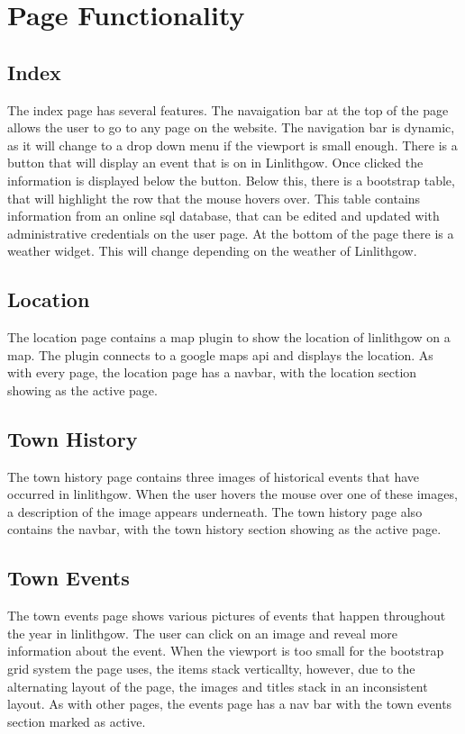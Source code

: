 \documentclass[12pt,a4paper]{article}
\begin{document}
	\clearpage

	\section{Page Functionality}
		\subsection{Index}
		The index page has several features. The navaigation bar at the top of the page allows the user to go to any page on the website. The navigation bar is dynamic, as it will change to a drop down menu if the viewport is small enough. There is a button that will display an event that is on in Linlithgow. Once clicked the information is displayed below the button. Below this, there is a bootstrap table, that will highlight the row that the mouse hovers over. This table contains information from an online sql database, that can be edited and updated with administrative credentials on the user page. At the bottom of the page there is a weather widget. This will change depending on the weather of Linlithgow.

		\subsection{Location}
		The location page contains a map plugin to show the location of linlithgow on a map. The plugin connects to a google maps api and displays the location. As with every page, the location page has a navbar, with the location section showing as the active page.

		\subsection{Town History}
		The town history page contains three images of historical events that have occurred in linlithgow. When the user hovers the mouse over one of these images, a description of the image appears underneath. The town history page also contains the navbar, with the town history section showing as the active page.

		\subsection{Town Events}
		The town events page shows various pictures of events that happen throughout the year in linlithgow. The user can click on an image and reveal more information about the event. When the viewport is too small for the bootstrap grid system the page uses, the items stack verticallty, however, due to the alternating layout of the page, the images and titles stack in an inconsistent layout. As with other pages, the events page has a nav bar with the town events section marked as active.
\end{document}

